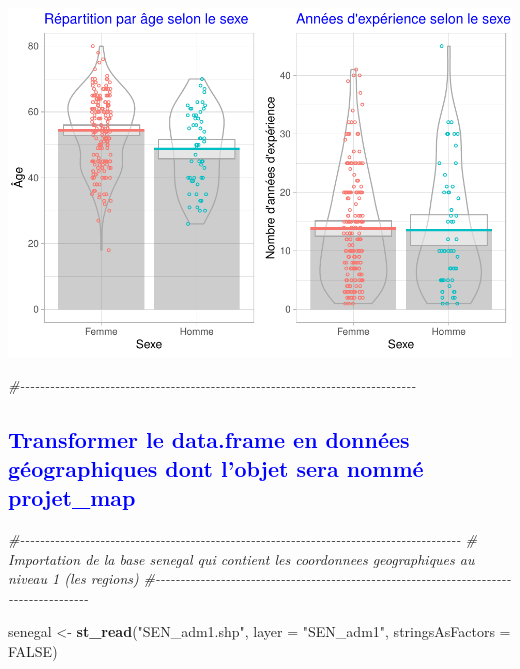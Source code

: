 \documentclass[
]{article}
\newenvironment{Shaded}{\begin{snugshade}}{\end{snugshade}}
\newcommand{\AttributeTok}[1]{\textcolor[rgb]{0.13,0.29,0.53}{#1}}
\newcommand{\CommentTok}[1]{\textcolor[rgb]{0.56,0.35,0.01}{\textit{#1}}}
\newcommand{\ConstantTok}[1]{\textcolor[rgb]{0.56,0.35,0.01}{#1}}
\newcommand{\FunctionTok}[1]{\textcolor[rgb]{0.13,0.29,0.53}{\textbf{#1}}}
\newcommand{\NormalTok}[1]{#1}
\newcommand{\OtherTok}[1]{\textcolor[rgb]{0.56,0.35,0.01}{#1}}
\newcommand{\StringTok}[1]{\textcolor[rgb]{0.31,0.60,0.02}{#1}}
\begin{document}
\includegraphics{PROJET_files/figure-latex/unnamed-chunk-22-1.pdf}

\begin{Shaded}
\begin{Highlighting}[]
\CommentTok{\#{-}{-}{-}{-}{-}{-}{-}{-}{-}{-}{-}{-}{-}{-}{-}{-}{-}{-}{-}{-}{-}{-}{-}{-}{-}{-}{-}{-}{-}{-}{-}{-}{-}{-}{-}{-}{-}{-}{-}{-}{-}{-}{-}{-}{-}{-}{-}{-}{-}{-}{-}{-}{-}{-}{-}{-}{-}{-}{-}{-}{-}{-}{-}{-}{-}{-}{-}{-}{-}{-}{-}{-}{-}{-}{-}{-}{-}{-}{-}}
\end{Highlighting}
\end{Shaded}

\newpage

\textcolor{blue}{\subsection{ Transformer le data.frame en données géographiques dont l’objet sera nommé projet\_map}}

\begin{Shaded}
\begin{Highlighting}[]
\CommentTok{\#{-}{-}{-}{-}{-}{-}{-}{-}{-}{-}{-}{-}{-}{-}{-}{-}{-}{-}{-}{-}{-}{-}{-}{-}{-}{-}{-}{-}{-}{-}{-}{-}{-}{-}{-}{-}{-}{-}{-}{-}{-}{-}{-}{-}{-}{-}{-}{-}{-}{-}{-}{-}{-}{-}{-}{-}{-}{-}{-}{-}{-}{-}{-}{-}{-}{-}{-}{-}{-}{-}{-}{-}{-}{-}{-}{-}{-}{-}{-}{-}{-}{-}{-}{-}{-}{-}{-}{-}}
\CommentTok{\# Importation de la base senegal qui contient les coordonnees geographiques au niveau 1 (les regions)}
\CommentTok{\#{-}{-}{-}{-}{-}{-}{-}{-}{-}{-}{-}{-}{-}{-}{-}{-}{-}{-}{-}{-}{-}{-}{-}{-}{-}{-}{-}{-}{-}{-}{-}{-}{-}{-}{-}{-}{-}{-}{-}{-}{-}{-}{-}{-}{-}{-}{-}{-}{-}{-}{-}{-}{-}{-}{-}{-}{-}{-}{-}{-}{-}{-}{-}{-}{-}{-}{-}{-}{-}{-}{-}{-}{-}{-}{-}{-}{-}{-}{-}{-}{-}{-}{-}{-}{-}{-}{-}}

\NormalTok{senegal }\OtherTok{\textless{}{-}} \FunctionTok{st\_read}\NormalTok{(}\StringTok{"SEN\_adm1.shp"}\NormalTok{, }\AttributeTok{layer =} \StringTok{"SEN\_adm1"}\NormalTok{, }\AttributeTok{stringsAsFactors =} \ConstantTok{FALSE}\NormalTok{)}
\end{Highlighting}
\end{Shaded}
\end{document}

